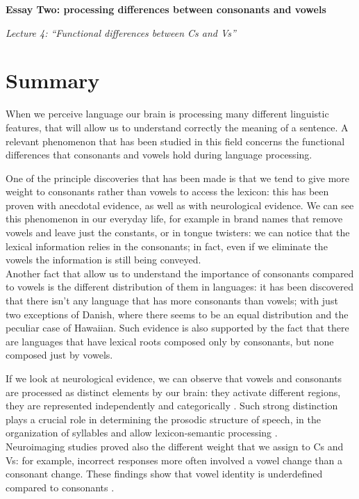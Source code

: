 \begin{flushleft}
    {\fontsize{16}{18}\selectfont\textbf{Essay Two: processing differences between consonants and vowels}} 

    \bigskip

    {\fontsize{14}{16}\selectfont \textit{Lecture 4: “Functional differences between Cs and Vs”}}
\end{flushleft}

\section*{Summary}
When we perceive language our brain is processing many different linguistic features, that will allow us to understand correctly the meaning of a sentence. A relevant phenomenon that has been studied in this field concerns the functional differences that consonants and vowels hold during language processing. 

One of the principle discoveries that has been made is that we tend to give more weight to consonants rather than vowels to access the lexicon: this has been proven with anecdotal evidence, as well as with neurological evidence. 
We can see this phenomenon in our everyday life, for example in brand names that remove vowels and leave just the constants, or in tongue twisters: we can notice that the lexical information relies in the consonants; in fact, even if we eliminate the vowels the information is still being conveyed. \\
Another fact that allow us to understand the importance of consonants compared to vowels is the different distribution of them in languages: it has been discovered that there isn't any language that has more consonants than vowels; with just two exceptions of Danish, where there seems to be an equal distribution and the peculiar case of Hawaiian. 
Such evidence is also supported by the fact that there are languages that have lexical roots composed only by consonants, but none composed just by vowels. 

If we look at neurological evidence, we can observe that vowels and consonants are processed as distinct elements by our brain: they activate different regions, they are represented independently and categorically \parencite{Caramazza_2000}. Such strong distinction plays a crucial role in determining the prosodic structure of speech, in the organization of syllables and allow lexicon-semantic processing \parencite{Carreiras_2008, Boatman_1997}. \\
Neuroimaging studies proved also the different weight that we assign to Cs and Vs: for example, incorrect responses more often involved a vowel change than a consonant change. These findings show that vowel identity is underdefined compared to consonants \parencite{Ooijen_1996}.

